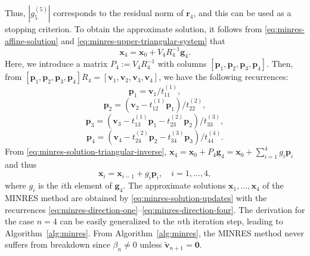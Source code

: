 {Thus, $|g_5^{(5)}|$ corresponds to the residual norm of $\bm r_4$, and this can be used as a stopping criterion. To obtain the approximate solution, it follows from \eqref{eq:minres-affine-solution} and \eqref{eq:minres-upper-triangular-system} that}
\begin{equation}\label{eq:minres-solution-triangular-inverse}\bm x_4=\bm x_0+V_4R_4^{-1}\bm g_4.\end{equation}
{Here, we introduce a matrix $P_4:=V_4R_4^{-1}$ with columns $[\bm p_1,\bm p_2,\bm p_3,\bm p_4]$. Then, from $[\bm p_1,\bm p_2,\bm p_3,\bm p_4]R_4=[\bm v_1,\bm v_2,\bm v_3,\bm v_4]$, we have the following recurrences:}
\begin{equation}\label{eq:minres-direction-one}\bm p_1=\bm v_1/t_{11}^{(1)},\end{equation}
\begin{equation}\label{eq:minres-direction-two}\bm p_2=(\bm v_2-t_{12}^{(1)}\bm p_1)/t_{22}^{(2)},\end{equation}
\begin{equation}\label{eq:minres-direction-three}\bm p_3=(\bm v_3-t_{13}^{(1)}\bm p_1-t_{23}^{(2)}\bm p_2)/t_{33}^{(3)},\end{equation}
\begin{equation}\label{eq:minres-direction-four}\bm p_4=(\bm v_4-t_{24}^{(2)}\bm p_2-t_{34}^{(3)}\bm p_3)/t_{44}^{(4)}.\end{equation}
{From \eqref{eq:minres-solution-triangular-inverse}, $\bm x_4=\bm x_0+P_4\bm g_4=\bm x_0+\sum_{i=1}^4g_i\bm p_i$ and thus}
\begin{equation}\label{eq:minres-solution-updates}\bm x_i=\bm x_{i-1}+g_i\bm p_i,\quad i=1,\ldots,4,\end{equation}
{where $g_i$ is the $i$th element of $\bm g_4$. The approximate solutions $\bm x_1,\ldots,\bm x_4$ of the MINRES method are obtained by \eqref{eq:minres-solution-updates} with the recurrences \eqref{eq:minres-direction-one}--\eqref{eq:minres-direction-four}. The derivation for the case $n=4$ can be easily generalized to the $n$th iteration step, leading to Algorithm\ \ref{alg:minres}. From Algorithm\ \ref{alg:minres}, the MINRES method never suffers from breakdown since $\beta_n\ne0$ unless $\widetilde{\bm v}_{n+1}=\bm0$.}
